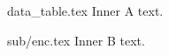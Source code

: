\begin{filecontents*}{data_table.tex}
Inner A text.\label{a}
\end{filecontents*}
\begin{filecontents*}{sub/enc.tex}
Inner B text.\label{b}
\end{filecontents*}
\documentclass{article}

\section{S}



See \ref{a} and \ref{b}.

